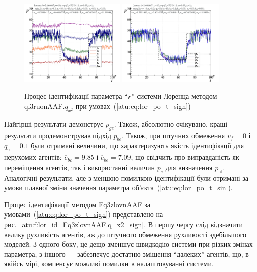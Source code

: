 \documentclass[a4paper,13pt]{atuaref}
\begin{document}
\begin{figure}[ht!]
  \centerline{
    \includegraphics[width=0.45\textwidth]{p5/p/cha/lor/ql3ruonAAF/lor_ql3ruonAAF_qy2-p_t_pi_sign.png}
    \hfill
    \includegraphics[width=0.45\textwidth]{p5/p/cha/lor/ql3ruonAAF/lor_ql3ruonAAF_qy2-p_t_pz_sign.png}
  }
  \caption{Процес ідентифікації параметра ``$r$'' системи Лоренца методом ql3ruonAAF.$q_{x^2}$ при умовах~(\ref{atu:eq:lor_po_t_sign})}
  \label{atu:f:lor_id_ql3ruonAAF.q_x2_sign}
\end{figure}

Найгірші результати демонструє $ p_{ge} $. Також, абсолютно очікувано, кращі
результати продемонстрував підхід $ p_{be}$. Також, при штучних обмеження
$v_f = 0 $ і $ q_\gamma = 0.1 $ були отримані величини, що характеризують
якість ідентифікації для нерухомих агентів:
$ \overline{e}_{bc} = 9.85 $ і
$ \overline{e}_{be} = 7.09 $, що свідчить про виправданість як переміщення
агентів, так і використанні величин $ p_e $ для визначення $ p_\mathrm{id} $.
Аналогічні результати, але з меншою помилкою ідентифікації були отримані за
умови плавної зміни значення параметра об'єкта~(\ref{atu:eq:lor_po_t_sin}).

Процес ідентифікації методом Fq3zlovnAAF за умовами~(\ref{atu:eq:lor_po_t_sign}) представлено
на рис.~\ref{atu:f:lor_id_Fq3zlovnAAF.q_x2_sign}. В першу чергу слід
відзначити велику рухливість агентів, аж до штучного обмеження рухливості
здебільшого моделей. З одного боку, це дещо зменшує швидкодію системи при
різких змінах параметра, з іншого --- забезпечує достатню зміщення ``далеких''
агентів, що, в якійсь мірі, компенсує можливі помилки в налаштовуванні системи.
\end{document}
